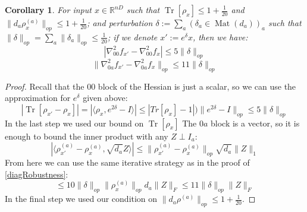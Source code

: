 \documentclass[aos]{imsart}
\newtheorem{corollary}[theorem]{Corollary}
\theoremstyle{definition}
\numberwithin{equation}{section}
\DeclareMathOperator{\Mat}{Mat}
\DeclareMathOperator{\tr}{Tr}
\newcommand{\R}{{\mathbb{R}}}
\newcommand{\samp}{x}
\newcommand{\AR}[1]{{\color{orange}[AR: #1]}}
\begin{document}
\begin{appendix}
\begin{corollary} \label{constantRobustness}
For input $\samp \in \R^{nD}$ such that $\tr[\rho_{\samp}] \leq 1 + \frac{1}{20}$ and $\|d_{a} \rho_{\samp}^{(a)}\|_{op} \leq 1 + \frac{1}{20}$; and perturbation $\delta := \sum_{a} (\delta_{a} \in \Mat(d_{a}))_{a}$ such that $\|\delta\|_{op} = \sum_{a} \|\delta_{a}\|_{op} \leq \frac{1}{20}$; if we denote $\samp' := e^{\delta} \samp$, then we have:
\[ |\nabla^{2}_{00} f_{\samp'} - \nabla^{2}_{00} f_{\samp}| \leq 5 \|\delta\|_{op}     \]
\[ \|\nabla^{2}_{0a} f_{\samp'} - \nabla^{2}_{0a} f_{\samp}\|_{op} \leq 11 \|\delta\|_{op}    \]
\end{corollary}
\begin{proof}
Recall that the $00$ block of the Hessian is just a scalar, so we can use the approximation for $e^{\delta}$ given above:
\[ |\tr[\rho_{\samp'} - \rho_{\samp}]| = |\langle \rho_{\samp}, e^{2\delta} - I \rangle| \leq |Tr[\rho_{\samp}]-1|) \|e^{2 \delta} - I\|_{op} \leq 5 \|\delta\|_{op}     \]
In the last step we used our bound on $\tr[\rho_{\samp}]$
The $0a$ block is a vector, so it is enough to bound the inner product with any $Z \perp I_{a}$:
\[ |\langle \rho_{\samp'}^{(a)} - \rho_{\samp}^{(a)}, \sqrt{d_{a}} Z \rangle| \leq \|\rho_{\samp'}^{(a)} - \rho_{\samp}^{(a)}\|_{op} \sqrt{d_{a}} \|Z\|_{1} \]
From here we can use the same iterative strategy as in the proof of \cref{diagRobustness}:
\[ \leq 10 \|\delta\|_{op} \|\rho^{(a)}_{\samp}\|_{op} d_{a} \|Z\|_{F} \leq 11 \|\delta\|_{op} \|Z\|_{F}   \]
In the final step we used our condition on $\|d_{a} \rho^{(a)}\|_{op} \leq 1 + \frac{1}{20}$.
\end{proof}


\end{appendix}
\end{document}
